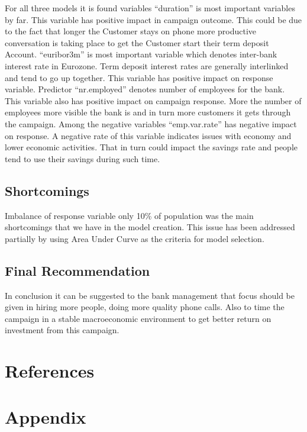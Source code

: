 \documentclass[english,floatsintext,man]{apa6}
\begin{document}
For all three models it is found variables \enquote{duration} is most
important variables by far. This variable has positive impact in
campaign outcome. This could be due to the fact that longer the Customer
stays on phone more productive conversation is taking place to get the
Customer start their term deposit Account. \enquote{euribor3m} is most
important variable which denotes inter-bank interest rate in Eurozone.
Term deposit interest rates are generally interlinked and tend to go up
together. This variable has positive impact on response variable.
Predictor \enquote{nr.employed} denotes number of employees for the
bank. This variable also has positive impact on campaign response. More
the number of employees more visible the bank is and in turn more
customers it gets through the campaign. Among the negative variables
\enquote{emp.var.rate} has negative impact on response. A negative rate
of this variable indicates issues with economy and lower economic
activities. That in turn could impact the savings rate and people tend
to use their savings during such time.

\subsection{Shortcomings}\label{shortcomings}

Imbalance of response variable only 10\% of population was the main
shortcomings that we have in the model creation. This issue has been
addressed partially by using Area Under Curve as the criteria for model
selection.

\subsection{Final Recommendation}\label{final-recommendation}

In conclusion it can be suggested to the bank management that focus
should be given in hiring more people, doing more quality phone calls.
Also to time the campaign in a stable macroeconomic environment to get
better return on investment from this campaign.

\newpage

\section{References}\label{references}

\section{Appendix}\label{appendix}
\end{document}
